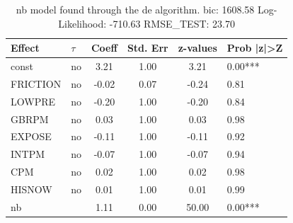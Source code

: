 \begin{table}
	\caption{nb model found through the de algorithm. bic: 1608.58 Log-Likelihood: -710.63 RMSE_TEST: 23.70}
	\begin{center}
		\begin{tabular}{|l|l|c|c|c|l|}
			\hline
			Effect & $\tau$ & Coeff & Std. Err & z-values & Prob |z|>Z \\
			\hline
			const & no & 3.21 & 1.00 & 3.21 & 0.00*** \\
			\hline
			FRICTION & no & -0.02 & 0.07 & -0.24 & 0.81 \\
			\hline
			LOWPRE & no & -0.20 & 1.00 & -0.20 & 0.84 \\
			\hline
			GBRPM & no & 0.03 & 1.00 & 0.03 & 0.98 \\
			\hline
			EXPOSE & no & -0.11 & 1.00 & -0.11 & 0.92 \\
			\hline
			INTPM & no & -0.07 & 1.00 & -0.07 & 0.94 \\
			\hline
			CPM & no & 0.02 & 1.00 & 0.02 & 0.98 \\
			\hline
			HISNOW & no & 0.01 & 1.00 & 0.01 & 0.99 \\
			\hline
			nb &  & 1.11 & 0.00 & 50.00 & 0.00*** \\
			\hline
		\end{tabular}
	\end{center}
\end{table}